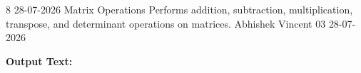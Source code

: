 \clearpage
\label{prog:08}
\programhead
  {8}
  {28-07-2026}
  {Matrix Operations}
  {Performs addition, subtraction, multiplication, transpose, and determinant operations on matrices.}
  {Abhishek Vincent}
  {03}
  {28-07-2026}

\divider
\textbf{Output Text:}\par
\vspace{2pt}

